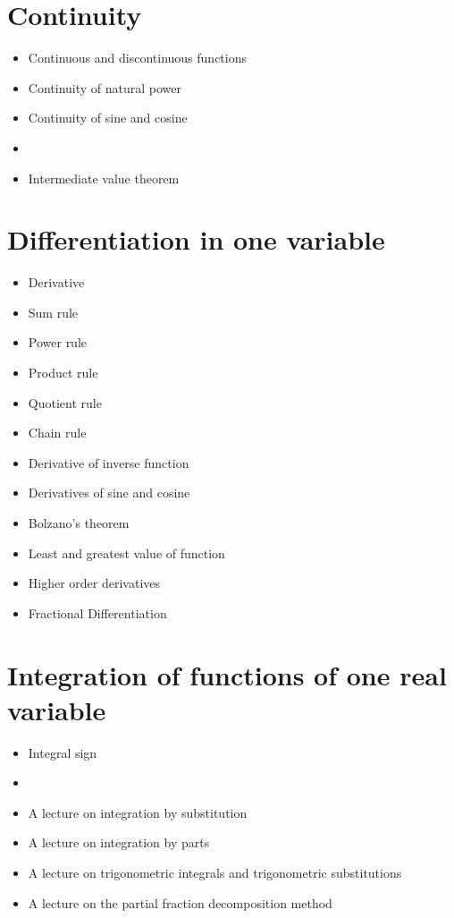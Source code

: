\documentclass[12pt]{article}
\theoremstyle{definition}
\begin{document}
\section{Continuity}
\begin{itemize}
\item Continuous and discontinuous functions
\item Continuity of natural power
\item Continuity of sine and cosine
\item {}
\item Intermediate value theorem 
\end{itemize} 

\section{Differentiation in one variable}
\begin{itemize}
\item Derivative
\item Sum rule
\item Power rule
\item Product rule
\item Quotient rule
\item Chain rule
\item Derivative of inverse function
\item Derivatives of sine and cosine
\item Bolzano's theorem
\item Least and greatest value of function
\item Higher order derivatives
\item Fractional Differentiation
\end{itemize}

\section{Integration of functions of one real variable}
\begin{itemize}
\item Integral sign
\item {}
\item A lecture on integration by substitution
\item A lecture on integration by parts
\item A lecture on trigonometric integrals and trigonometric substitutions
\item A lecture on the partial fraction decomposition method
\end{itemize}
\end{document}
